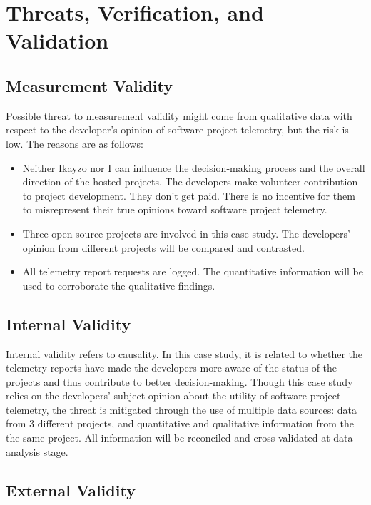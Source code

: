 \section{Threats, Verification, and Validation} \label{EvaluationInIkayzo:Threats}

\subsection{Measurement Validity}

Possible threat to measurement validity might come from qualitative data with respect to the developer's opinion of software project telemetry, but the risk is low. The reasons are as follows:

\begin{itemize}
	\item Neither Ikayzo nor I can influence the decision-making process and the overall direction of the hosted projects. The developers make volunteer contribution to project development. They don't get paid. There is no incentive for them to misrepresent their true opinions toward software project telemetry.
	
	\item Three open-source projects are involved in this case study. The developers' opinion from different projects will be compared and contrasted.
	
	\item All telemetry report requests are logged. The quantitative information will be used to corroborate the qualitative findings. 
\end{itemize}


\subsection{Internal Validity}

Internal validity refers to causality. In this case study, it is related to whether the telemetry reports have made the developers more aware of the status of the projects and thus contribute to better decision-making. Though this case study relies on the developers' subject opinion about the utility of software project telemetry, the threat is mitigated through the use of multiple data sources: data from 3 different projects, and quantitative and qualitative information from the the same project. All information will be reconciled and cross-validated at data analysis stage.


\subsection{External Validity}

